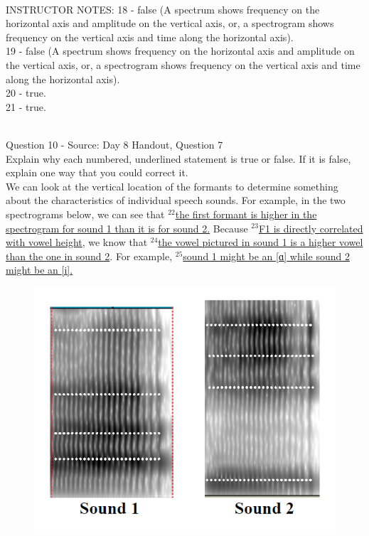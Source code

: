 \documentclass[12pt]{article}
\begin{document}
~\\
INSTRUCTOR NOTES: 18 - false (A spectrum shows frequency on the horizontal axis and amplitude on the vertical axis, or, a spectrogram shows frequency on the vertical axis and time along the horizontal axis).\\19 - false (A spectrum shows frequency on the horizontal axis and amplitude on the vertical axis, or, a spectrogram shows frequency on the vertical axis and time along the horizontal axis).\\20 - true.\\21 - true.


~\\

{\large Question 10} - Source: Day 8 Handout, Question 7\\

Explain why each numbered, underlined statement is true or false. If it is false, explain one way that you could correct it.\\

We can look at the vertical location of the formants to determine something about the characteristics of individual speech sounds. For example, in the two spectrograms below, we can see that $^{22}$\ul{the first formant is higher in the spectrogram for sound 1 than it is for sound 2.} Because $^{23}$\ul{F1 is directly correlated with vowel height}, we know that $^{24}$\ul{the vowel pictured in sound 1 is a higher vowel than the one in sound 2}. For example, $^{25}$\ul{sound 1 might be an {[ɑ]} while sound 2 might be an {[i]}.}

\begin{figure}[H]
\includegraphics{../images/sound1a_sound2i.png}
\end{figure}
\end{document}
